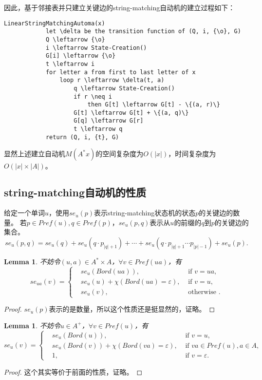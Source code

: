 \documentclass[UTF8]{ctexart}
\newtheorem{lem}[thm]{Lemma}
\theoremstyle{definition}
\theoremstyle{remark}
\numberwithin{equation}{subsection}
\begin{document}
	因此，基于邻接表并只建立关键边的string-matching自动机的建立过程如下：
	\begin{lstlisting}[frame=shadowbox,framexleftmargin=5mm,rulesepcolor=\color{gray},numbers=none]
		LinearStringMatchingAutoma(x)
			let \delta be the transition function of (Q, i, {\o}, G)
			Q \leftarrow {\o}
			i \leftarrow State-Creation()
			G[i] \leftarrow {\o}
			t \leftarrow i
			for letter a from first to last letter of x
				loop r \leftarrow \delta(t, a)
					q \leftarrow State-Creation()
					if r \neq i
						then G[t] \leftarrow G[t] - \{(a, r)\}
					G[t] \leftarrow G[t] + \{(a, q)\}
					G[q] \leftarrow G[r]
					t \leftarrow q
			return (Q, i, {t}, G)
	\end{lstlisting}
	
	显然上述建立自动机$M(A^*x)$的空间复杂度为$O(|x|)$，时间复杂度为$O(|x| \times |A|)$。
	
\subsection{string-matching自动机的性质}

	给定一个单词$u$，使用$se_u(p)$表示string-matching状态机的状态$p$的关键边的数量。
	若$p \in Pref(u), q \in Pref(p)$，$se_u(p,q)$表示从$u$的前缀的$q$到$p$的关键边的集合。
	\[
		se_u(p,q) = se_u(q) + se_u(q \cdot p_{|q|+1}) + \cdots + se_u(q \cdot p_{|q|+1} \cdots p_{|p|-1}) + se_u(p).
	\]
	\begin{lem}
		不妨令$(u,a) \in A^* \times A$，$\forall v \in Pref(ua)$，有
		\[
			se_{ua}(v) =
			\left\{
				\begin{aligned}
					&se_u(Bord(ua)),	&\text{ if } v = ua,	\\
					&se_u(u) + \chi(Bord(ua) = \varepsilon),	&\text{ if } v = u,	\\
					&se_u(v),			&\text{ otherwise }.
				\end{aligned}
			\right .
		\]
	\end{lem}
	\begin{proof}
		$se_u(p)$表示的是数量，所以这个性质还是挺显然的，证略。
	\end{proof}
	
	\begin{lem}
		不妨令$u \in A^+$，$\forall v \in Pref(u)$，有
		\[
			se_u(v) =
			\left\{
				\begin{aligned}
					&se_u(Bord(u)),		&\text{ if } v = u, \\
					&se_u(Bord(v)) + \chi(Bord(va) = \varepsilon),	&\text{ if } va \in Pref(u), a \in A,	\\
					&1,					&\text{ if } v = \varepsilon.
				\end{aligned}
			\right .
		\]
	\end{lem}
	\begin{proof}
		这个其实等价于前面的性质，证略。
	\end{proof}
	
\end{document}
